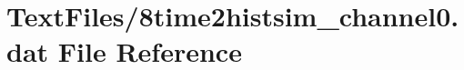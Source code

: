 \hypertarget{8time2histsim__channel0_8dat}{}\section{Text\+Files/8time2histsim\+\_\+channel0.dat File Reference}
\label{8time2histsim__channel0_8dat}
